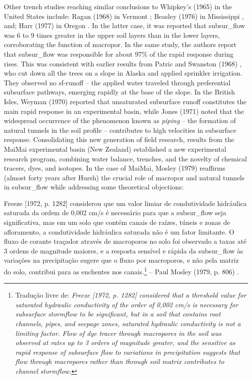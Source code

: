 \documentclass[./main_en.tex]{subfiles}
\begin{document}
\par Other trench studies reaching similar conclusions to Whipkey's (1965) in the United States include: Ragan (1968) in Vermont \cite{Ragan1968}; Beasley (1976) in Mississippi \cite{Beasley1976}, and; Harr (1977) in Oregon \cite{Harr1977}. In the latter case, it was reported that \gls{subsur_flow} was 6 to 9 times greater in the upper soil layers than in the lower layers, corroborating the function of \gls{macropor}. In the same study, the authors report that \gls{subsur_flow} was responsible for about 97\% of the rapid response during rises. This was consistent with earlier results from Patric and Swanston (1968) \cite{patric1968}, who cut down all the trees on a slope in Alaska and applied sprinkler irrigation. They observed no \gls{sf-runoff} -- the applied water traveled through preferential subsurface pathways, emerging rapidly at the base of the slope. In the British Isles, Weyman (1970) \cite{weyman1970} reported that unsaturated subsurface runoff constitutes the main rapid response in an experimental basin, while Jones (1971) \cite{Jones1971} noted that the widespread occurrence of the phenomenon known as \textit{piping} -- the formation of natural tunnels in the soil profile -- contributes to high velocities in subsurface response. Consolidating this new generation of field research, results from the MaiMai experimental basin (New Zealand) established a new experimental research program, combining water balance, trenches, and the novelty of chemical tracers, dyes, and isotopes. In the case of MaiMai, Mosley (1979) \cite{Mosley1979} reaffirms (almost forty years after Hursh) the crucial role of \gls{macropor} and natural tunnels in \gls{subsur_flow} while addressing some theoretical objections:

\begin{adjustwidth}{100pt}{0pt}
\medskip
\small Freeze [1972, p. 1282] considerou que um valor limiar de condutividade hidráulica saturada da ordem de 0,002 cm/s é necessário para que a \gls{subsur_flow} seja significativa, mas em um solo que contém canais de raízes, túneis e zonas de afloramento, a condutividade hidráulica saturada não é um fator limitante. O fluxo de corante traçador através de macroporos no solo foi observado a taxas até 3 ordens de magnitude maiores, e a resposta sensível e rápida da \gls{subsur_flow} às variações na precipitação sugere que o fluxo por macroporos, e não pela matriz do solo, contribui para as enchentes nos canais.\footnote{Tradução livre de: \textit{Freeze [1972, p. 1282] considered that a threshold value for saturated hydraulic conductivity of the order of 0,002 cm/s is necessary for subsurface stormflow to be significant, but in a soil that contains root channels, pipes, and seepage zones, saturated hydraulic conductivity is not a limiting factor. Flow of dye tracer through macropores in the soil was observed at rates up to 3 orders of magnitude greater, and the sensitive as rapid response of subsurface flow to variations in precipitation suggests that flow through macropores rather than through soil matrix contributes to channel stormflow.}} -- Paul Mosley (1979, p. 806) \cite{Mosley1979}.
\medskip
\end{adjustwidth}
\end{document}
